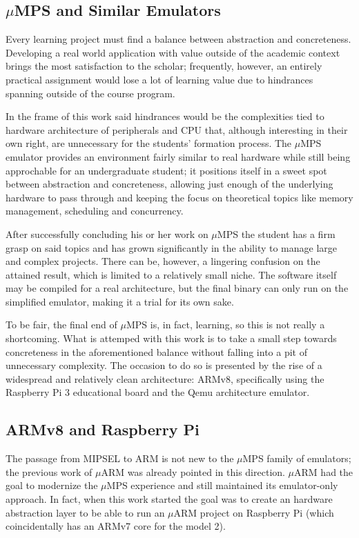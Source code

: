 \documentclass[12pt,a4paper,openright,twoside]{report}
\begin{document}
\subsection{$\mu$MPS and Similar Emulators}
Every learning project must find a balance between abstraction and concreteness.
Developing a real world application with value outside of the academic context
 brings the most satisfaction to the scholar; frequently, however, an entirely
 practical assignment would lose a lot of learning value due to hindrances
 spanning outside of the course program.
 
In the frame of this work said hindrances would be the complexities tied to
hardware architecture of peripherals and CPU that, although interesting
in their own right, are unnecessary for the students' formation process.
The $\mu$MPS emulator provides an environment fairly similar to real hardware
while still being approchable for an undergraduate student; it positions itself
in a sweet spot between abstraction and concreteness, allowing just enough
of the underlying hardware to pass through and keeping the focus on 
theoretical topics like memory management, scheduling and concurrency.

After successfully concluding his or her work on $\mu$MPS the student has
a firm grasp on said topics and has grown significantly in the ability to
manage large and complex projects. There can be, however, a lingering confusion
on the attained result, which is limited to a relatively small niche.
The software itself may be compiled for a real architecture, but the final binary
can only run on the simplified emulator, making it a trial for its own sake.

To be fair, the final end of $\mu$MPS is, in fact, learning, so this is not really a shortcoming.
What is attemped with this work is to take a small step towards concreteness in 
the aforementioned balance without falling into a pit of unnecessary complexity.
The occasion to do so is presented by the rise of a widespread and relatively
clean architecture: ARMv8, specifically using the Raspberry Pi 3 educational board
and the Qemu architecture emulator.

\subsection{ARMv8 and Raspberry Pi}
The passage from MIPSEL to ARM is not new to the $\mu$MPS family of emulators; 
the previous work
of $\mu$ARM was already pointed in this direction. $\mu$ARM had the goal to
modernize the $\mu$MPS experience and still maintained its emulator-only approach.
In fact, when this work started the goal was to create an hardware abstraction
layer to be able to run an $\mu$ARM project on Raspberry Pi (which 
coincidentally has an ARMv7 core for the model 2).
\end{document}
